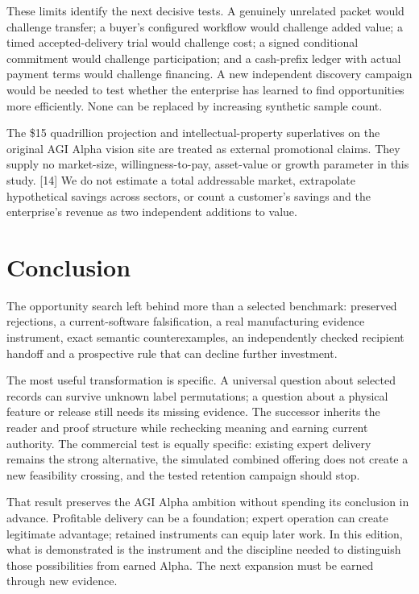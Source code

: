 \documentclass[
  11pt,
]{article}
\let\OriginalSection\section
\renewcommand{\section}{\needspace{5\baselineskip}\OriginalSection}
\begin{document}
These limits identify the next decisive tests. A genuinely unrelated
packet would challenge transfer; a buyer's configured workflow would
challenge added value; a timed accepted-delivery trial would challenge
cost; a signed conditional commitment would challenge participation; and
a cash-prefix ledger with actual payment terms would challenge
financing. A new independent discovery campaign would be needed to test
whether the enterprise has learned to find opportunities more
efficiently. None can be replaced by increasing synthetic sample count.

The \$15 quadrillion projection and intellectual-property superlatives
on the original AGI Alpha vision site are treated as external
promotional claims. They supply no market-size, willingness-to-pay,
asset-value or growth parameter in this study. {[}14{]} We do not
estimate a total addressable market, extrapolate hypothetical savings
across sectors, or count a customer's savings and the enterprise's
revenue as two independent additions to value.

\hypertarget{conclusion}{%
\section{Conclusion}\label{conclusion}}

The opportunity search left behind more than a selected benchmark:
preserved rejections, a current-software falsification, a real
manufacturing evidence instrument, exact semantic counterexamples, an
independently checked recipient handoff and a prospective rule that can
decline further investment.

The most useful transformation is specific. A universal question about
selected records can survive unknown label permutations; a question
about a physical feature or release still needs its missing evidence.
The successor inherits the reader and proof structure while rechecking
meaning and earning current authority. The commercial test is equally
specific: existing expert delivery remains the strong alternative, the
simulated combined offering does not create a new feasibility crossing,
and the tested retention campaign should stop.

That result preserves the AGI Alpha ambition without spending its
conclusion in advance. Profitable delivery can be a foundation; expert
operation can create legitimate advantage; retained instruments can
equip later work. In this edition, what is demonstrated is the
instrument and the discipline needed to distinguish those possibilities
from earned Alpha. The next expansion must be earned through new
evidence.
\end{document}
